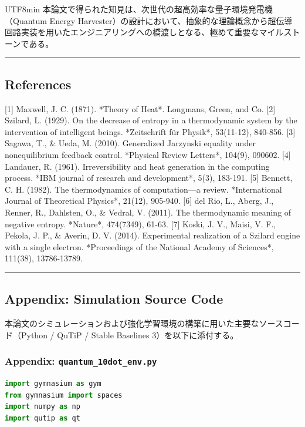 \documentclass[a4paper,11pt,twocolumn]{article}
\begin{document}
\begin{CJK*}{UTF8}{min}
本論文で得られた知見は、次世代の超高効率な量子環境発電機（Quantum Energy Harvester）の設計において、抽象的な理論概念から超伝導回路実装を用いたエンジニアリングへの橋渡しとなる、極めて重要なマイルストーンである。

\vspace{1em}\hrule\vspace{1em}

\subsection{References}
[1] Maxwell, J. C. (1871). *Theory of Heat*. Longmans, Green, and Co.
[2] Szilard, L. (1929). On the decrease of entropy in a thermodynamic system by the intervention of intelligent beings. *Zeitschrift für Physik*, 53(11-12), 840-856.
[3] Sagawa, T., \& Ueda, M. (2010). Generalized Jarzynski equality under nonequilibrium feedback control. *Physical Review Letters*, 104(9), 090602.
[4] Landauer, R. (1961). Irreversibility and heat generation in the computing process. *IBM journal of research and development*, 5(3), 183-191.
[5] Bennett, C. H. (1982). The thermodynamics of computation—a review. *International Journal of Theoretical Physics*, 21(12), 905-940.
[6] del Rio, L., Aberg, J., Renner, R., Dahlsten, O., \& Vedral, V. (2011). The thermodynamic meaning of negative entropy. *Nature*, 474(7349), 61-63.
[7] Koski, J. V., Maisi, V. F., Pekola, J. P., \& Averin, D. V. (2014). Experimental realization of a Szilard engine with a single electron. *Proceedings of the National Academy of Sciences*, 111(38), 13786-13789.


\vspace{1em}\hrule\vspace{1em}

\subsection{Appendix: Simulation Source Code}

本論文のシミュレーションおよび強化学習環境の構築に用いた主要なソースコード（Python / QuTiP / Stable Baselines 3）を以下に添付する。

\subsubsection{Appendix: \texttt{quantum\_10dot\_env.py}}

\begin{lstlisting}[language=Python]
import gymnasium as gym
from gymnasium import spaces
import numpy as np
import qutip as qt


\end{lstlisting}
\end{CJK*}
\end{document}
